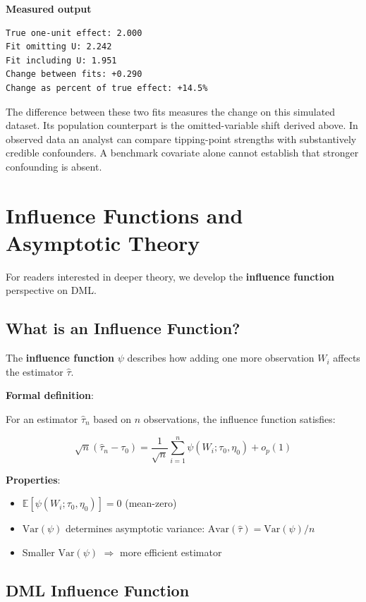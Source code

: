 \textbf{Measured output}

\begin{verbatim}
True one-unit effect: 2.000
Fit omitting U: 2.242
Fit including U: 1.951
Change between fits: +0.290
Change as percent of true effect: +14.5%
\end{verbatim}

The difference between these two fits measures the change on this simulated dataset. Its population counterpart is the omitted-variable shift derived above. In observed data an analyst can compare tipping-point strengths with substantively credible confounders. A benchmark covariate alone cannot establish that stronger confounding is absent.

\section{Influence Functions and Asymptotic
Theory}\label{_influence_functions_and_asymptotic_theory}

For readers interested in deeper theory, we develop the
\textbf{influence function} perspective on DML.

\subsection{What is an Influence
Function?}\label{_what_is_an_influence_function}

The \textbf{influence function} \(\psi\) describes how adding one more
observation \(W_i\) affects the estimator \(\hat{\tau}\).

\textbf{Formal definition}:

For an estimator \(\hat{\tau}_n\) based on \(n\) observations, the
influence function satisfies:

\[\sqrt{n}(\hat{\tau}_n - \tau_0) = \frac{1}{\sqrt{n}} \sum_{i=1}^n \psi(W_i; \tau_0, \eta_0) + o_p(1)\]

\textbf{Properties}:

\begin{itemize}
\item
  \(\mathbb{E}[\psi(W_i; \tau_0, \eta_0)] = 0\) (mean-zero)
\item
  \(\text{Var}(\psi)\) determines asymptotic variance:
  \(\text{Avar}(\hat{\tau}) = \text{Var}(\psi) / n\)
\item
  Smaller \(\text{Var}(\psi)\) \(\Rightarrow\) more efficient estimator
\end{itemize}

\subsection{DML Influence Function}\label{_dml_influence_function}

